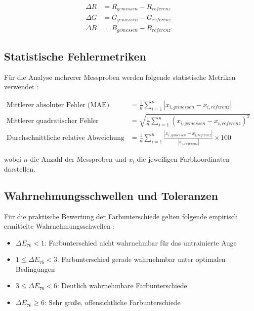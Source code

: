 \begin{align}
\Delta R &= R_{gemessen} - R_{referenz} \label{eq:delta_rgb_r}\\
\Delta G &= G_{gemessen} - G_{referenz} \label{eq:delta_rgb_g}\\
\Delta B &= B_{gemessen} - B_{referenz} \label{eq:delta_rgb_b}
\end{align}

\subsection{Statistische Fehlermetriken}

Für die Analyse mehrerer Messproben werden folgende statistische Metriken verwendet \parencite{Wyszecki1982}:

\begin{align}
\text{Mittlerer absoluter Fehler (MAE)} &= \frac{1}{n} \sum_{i=1}^{n} |x_{i,gemessen} - x_{i,referenz}| \label{eq:mae}\\
\text{Mittlerer quadratischer Fehler (RMSE)} &= \sqrt{\frac{1}{n} \sum_{i=1}^{n} (x_{i,gemessen} - x_{i,referenz})^2} \label{eq:rmse}\\
\text{Durchschnittliche relative Abweichung} &= \frac{1}{n} \sum_{i=1}^{n} \frac{|x_{i,gemessen} - x_{i,referenz}|}{|x_{i,referenz}|} \times 100 \label{eq:average_relative_error}
\end{align}

wobei $n$ die Anzahl der Messproben und $x_i$ die jeweiligen Farbkoordinaten darstellen.

\subsection{Wahrnehmungsschwellen und Toleranzen}

Für die praktische Bewertung der Farbunterschiede gelten folgende empirisch ermittelte Wahrnehmungsschwellen \parencite{CIE15:2018, Hunt1999}:

\begin{itemize}
    \item $\Delta E_{76} < 1$: Farbunterschied nicht wahrnehmbar für das untrainierte Auge
    \item $1 \leq \Delta E_{76} < 3$: Farbunterschied gerade wahrnehmbar unter optimalen Bedingungen
    \item $3 \leq \Delta E_{76} < 6$: Deutlich wahrnehmbare Farbunterschiede
    \item $\Delta E_{76} \geq 6$: Sehr große, offensichtliche Farbunterschiede
\end{itemize}

